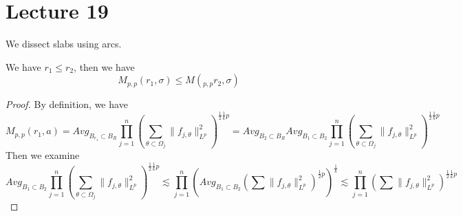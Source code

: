 \section{Lecture 19}
We dissect slabs using arcs.

\begin{lemma}
    We have $r_1\leq r_2$, then we have
    \begin{equation*}
        M_{p,p}(r_1, \sigma)\leq M(_{p,p}r_2, \sigma)
    \end{equation*}
\end{lemma}
\begin{proof}
    By definition, we have
    \begin{equation*}
        M_{p,p}(r_1, a)=Avg_{B_{r_1}\subset B_R}\prod_{j=1}^n\left(\sum_{\theta\subset\Omega_j}\|f_{j,\theta}\|_{L^p}^2 \right)^{\frac{1}{2}\frac{1}{k}p}=Avg_{B_2\subset B_R}Avg_{B_1\subset B_2}\prod_{j=1}^n\left(\sum_{\theta\subset\Omega_j}\|f_{j,\theta}\|_{L^p}^2 \right)^{\frac{1}{2}\frac{1}{k}p}
    \end{equation*}
   Then we examine 
   \begin{equation*}
    Avg_{B_1\subset B_2}\prod_{j=1}^n\left(\sum_{\theta\subset\Omega_j}\|f_{j,\theta}\|_{L^p}^2 \right)^{\frac{1}{2}\frac{1}{k}p}\lesssim \prod_{j=1}^n \left( Avg_{B_1\subset B_2}\left(\sum\|f_{j,\theta}\|_{L^p}^2\right)^{\frac{1}{2}p}\right)^{\frac{1}{k}}\lesssim \prod_{j=1}^n\left(\sum\|f_{j,\theta}\|_{L^p}^2 \right)^{\frac{1}{2}\frac{1}{k}p}
   \end{equation*}
\end{proof}